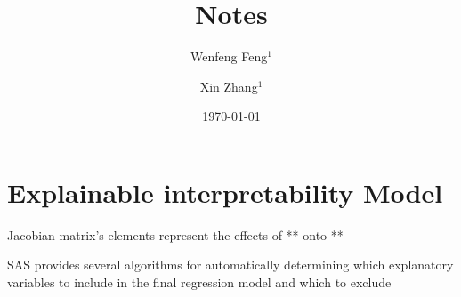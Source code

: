 \documentclass[a4paper]{article}
\title{
	Notes
	}
\author{Wenfeng Feng$^1$ \and Xin Zhang$^1$}
\date{
	\today
}
\begin{document}
	\maketitle
	

	\tableofcontents
	
	\section{Explainable interpretability Model}
	Jacobian matrix's elements represent the effects of ** onto **

	SAS provides several algorithms for automatically determining which explanatory variables to include in the final regression model and which to exclude
	

	
		
\end{document}
